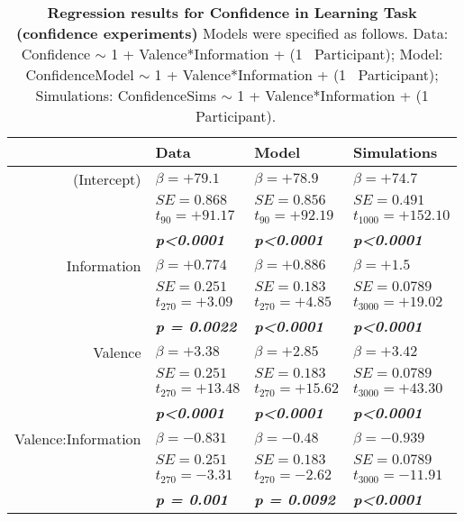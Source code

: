 % 
% 
\begin{table}
\centering \footnotesize
\begin{tabular}{r|lll}
\hline \hline
& \textbf{Data}& \textbf{Model}& \textbf{Simulations} \\
\hline
\hline (Intercept)&$\beta=+79.1$&$\beta=+78.9$&$\beta=+74.7$\\
&$SE=0.868$&$SE=0.856$&$SE=0.491$\\
&$t_{90}=+91.17$&$t_{90}=+92.19$&$t_{1000}=+152.10$\\
&\textbf{\textit{p\textless0.0001}}&\textbf{\textit{p\textless0.0001}}&\textbf{\textit{p\textless0.0001}}\\
\hline Information&$\beta=+0.774$&$\beta=+0.886$&$\beta=+1.5$\\
&$SE=0.251$&$SE=0.183$&$SE=0.0789$\\
&$t_{270}=+3.09$&$t_{270}=+4.85$&$t_{3000}=+19.02$\\
&\textbf{\textit{p = 0.0022}}&\textbf{\textit{p\textless0.0001}}&\textbf{\textit{p\textless0.0001}}\\
\hline Valence&$\beta=+3.38$&$\beta=+2.85$&$\beta=+3.42$\\
&$SE=0.251$&$SE=0.183$&$SE=0.0789$\\
&$t_{270}=+13.48$&$t_{270}=+15.62$&$t_{3000}=+43.30$\\
&\textbf{\textit{p\textless0.0001}}&\textbf{\textit{p\textless0.0001}}&\textbf{\textit{p\textless0.0001}}\\
\hline Valence:Information&$\beta=-0.831$&$\beta=-0.48$&$\beta=-0.939$\\
&$SE=0.251$&$SE=0.183$&$SE=0.0789$\\
&$t_{270}=-3.31$&$t_{270}=-2.62$&$t_{3000}=-11.91$\\
&\textbf{\textit{p = 0.001}}&\textbf{\textit{p = 0.0092}}&\textbf{\textit{p\textless0.0001}}\\
\hline \hline
\end{tabular}
\caption{\textbf{Regression results for Confidence in Learning Task (confidence experiments)} Models were specified as follows. Data: Confidence $\sim$ 1 + Valence*Information + (1 \textbar \ Participant); Model: ConfidenceModel $\sim$ 1 + Valence*Information + (1 \textbar \ Participant); Simulations: ConfidenceSims $\sim$ 1 + Valence*Information + (1 \textbar \ Participant).}
\label{tab:regConfidence_allexp}
\end{table}
